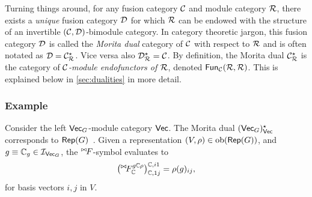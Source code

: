 Turning things around, for any fusion category $\mathcal{C}$ and module category $\mathcal{R}$, there exists a \emph{unique} fusion category $\mathcal{D}$ for which $\mathcal{R}$ can be endowed with the structure of an invertible $(\mathcal{C},\mathcal{D})$-bimodule category. In category theoretic jargon, this fusion category $\mathcal{D}$ is called the \emph{Morita dual} category of $\mathcal{C}$ with respect to $\mathcal{R}$ and is often notated as $\mathcal{D}=\mathcal{C}^\star_{\mathcal{R}}$. Vice versa also $\mathcal{D}^\star_{\mathcal{R}}=\mathcal{C}$. By definition, the Morita dual $\mathcal{C}^\star_{\mathcal{R}}$ is the category of \emph{$\mathcal{C}$-module endofunctors of $\mathcal{R}$}, denoted $\mathsf{Fun}_{\mathcal{C}}(\mathcal{R},\mathcal{R})$. This is explained below in \cref{sec:dualities} in more detail.

\subsubsection{Example} Consider the left $\mathsf{Vec}_G$-module category $\mathsf{Vec}$. The Morita dual $(\mathsf{Vec}_G)^\star_{\mathsf{Vec}}$ corresponds to $\mathsf{Rep}(G)$~\cite{Etingof2015}. Given a representation $(V,\rho)\in{\rm ob}(\mathsf{Rep}(G))$, and $g\equiv\mathbb C_g\in\mathcal{I}_{\mathsf{Vec}_G}$, the ${}^{\bowtie\!} F$-symbol evaluates to
\begin{equation}\label{eq:BimodAssocG}
	\big( {}^{\bowtie\!} F^{g\mathbb C\rho}_{\mathbb C} \big)_{\mathbb C,1j}^{\mathbb C,i1} = \rho(g)_{ij},
\end{equation}
for basis vectors $i,j$ in $V$.